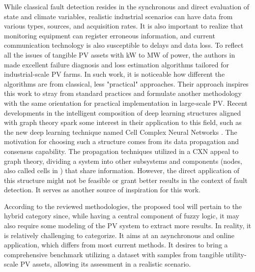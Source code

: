 While classical fault detection resides in the synchronous and direct evaluation of state and climate variables, realistic industrial scenarios can have data from various types, sources, and acquisition rates.
It is also important to realize that monitoring equipment can register erroneous information, and current communication technology is also susceptible to delays and data loss.
To reflect all the issues of tangible PV assets with kW to MW of power, the authors in \cite{Livera2022} made excellent failure diagnosis and loss estimation algorithms tailored for industrial-scale PV farms. In such work, it is noticeable how different the algorithms are from classical, less "practical" approaches. Their approach inspires this work to stray from standard practices and formulate another methodology with the same orientation for practical implementation in large-scale PV.
Recent developments in the intelligent composition of deep learning structures aligned with graph theory spark some interest in their application to this field, such as the new deep learning technique named Cell Complex Neural Networks \cite{Hajij2020}. The motivation for choosing such a structure comes from its data propagation and consensus capability. The propagation techniques utilized in a CXN appeal to graph theory, dividing a system into other subsystems and components (nodes, also called cells in \cite{Hajij2020}) that share information. However, the direct application of this structure might not be feasible or grant better results in the context of fault detection. It serves as another source of inspiration for this work.

According to the reviewed methodologies, the proposed tool will pertain to the hybrid category since, while having a central component of fuzzy logic, it may also require some modeling of the PV system to extract more results. In reality, it is relatively challenging to categorize. It aims at an asynchronous and online application, which differs from most current methods. It desires to bring a comprehensive benchmark utilizing a dataset with samples from tangible utility-scale PV assets, allowing its assessment in a realistic scenario.

